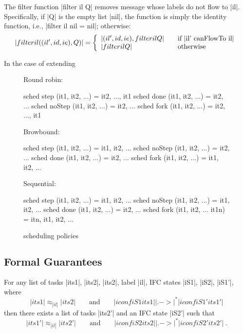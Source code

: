 The filter function |filter il Q| removes message whose labels do not
flow to |il|. Specifically, if |Q| is the empty list |nil|, the
function is simply the identity function, i.e.,
|filter il nil = nil|; otherwise:
\[
|filter il ((il', id, ie) , Q )| = \left\{
\begin{array}{l l}
|(il', id, ie) , filter il Q| & \quad \text{if |il' canFlowTo il|}\\
|filter il Q| & \quad \text{otherwise}
\end{array} \right.
\]


In the case of extending

\begin{figure}
  Round robin:
\begin{code}
  sched step (it1, it2, ...)    = {it2, ..., it1}
  sched done (it1, it2, ...)    = {it2, ...}
  sched noStep (it1, it2, ...)  = {it2, ...}
  sched fork (it1, it2, ...)    = {it2, ..., it1}
\end{code}
  Browbound:
\begin{code}
  sched step (it1, it2, ...)    = {it1, it2, ...}
  sched noStep (it1, it2, ...)  = {it2, ...}
  sched done (it1, it2, ...)    = {it2, ...}
  sched fork (it1, it2, ...)    = {it1, it2, ...}
\end{code}
  Sequential:
\begin{code}
  sched step (it1, it2, ...)       = {it1, it2, ...}
  sched noStep (it1, it2, ...)     = {it1, it2, ...}
  sched done (it1, it2, ...)       = {it2, ...}
  sched fork (it1, it2, ... it1n)  = {itn, it1, it2, ...}
\end{code}
\caption{scheduling policies}
\end{figure}



\subsection{Formal Guarantees}

\begin{theorem}
  For any list of tasks |its1|, |its2|, |its2|, label |il|,
  IFC states |iS1|, |iS2|, |iS1'|, where
  \begin{equation} \label{eq:tsni-lhs}
    |its1| \approx_{|il|} |its2|
    \qquad \text{and} \qquad
    |iconf iS1 its1| |.->|^* |iconf iS1' its1'|
  \end{equation}
  then there exists a list of tasks |its2'| and an IFC state |iS2'| such that
  \begin{equation} \label{eq:tsni-rhs}
    |its1'| \approx_{|il|} |its2'|
     \qquad \text{and} \qquad
    |iconf iS2 its2| |.->|^* |iconf iS2' its2'|
    \ \text{.}
  \end{equation}
\end{theorem}

